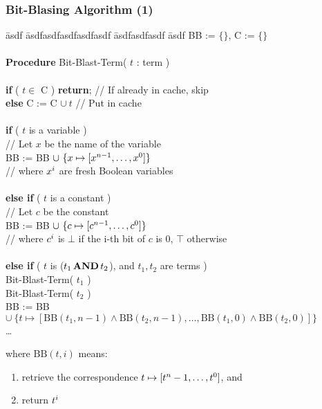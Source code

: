 \begin{frame}[fragile]
  \frametitle{Bit-Blasing Algorithm (1)}

  \tiny

  \begin{tabbing}
    \= asdf \= asdfasdfasdfasdfasdf \= asdfasdfasdf \= asdf \kill
    \> BB := $\{ \}$, C := $\{ \}$ \\
    \> \\
    \> {\bf Procedure} Bit-Blast-Term( $t$ :  term ) \\
    \> \\
    \> {\bf if} ( $t \in $ C ) {\bf return}; \> \> // If already in cache, skip \\
    \> {\bf else} C := C $\cup\ t$     \> \> // Put in cache \\
    \> \\ \pause
    \> {\bf if} ( $t$ is a  variable ) \\
    \> \> // Let $x$ be the name of the variable \\
    \> \> BB := BB $\cup\ \{ x \mapsto [x^{n-1}, \ldots, x^0] \}$ \\
    \> \> // where $x^i$ are fresh Boolean variables \\
    \> \\ \pause
    \> {\bf else if} ( $t$ is a  constant ) \\
    \> \> // Let $c$ be the constant \\
    \> \> BB := BB $\cup\ \{ c \mapsto [c^{n-1}, \ldots, c^0] \} $ \\
    \> \> // where $c^i$ is $\bot$ if the i-th bit of $c$ is $0$, $\top$ otherwise \\
    \> \\ \pause
    \> {\bf else if} ( $t$ is ($t_1 \,{\bf AND}\, t_2$), and $t_1, t_2$ are  terms ) \\
    \> \> Bit-Blast-Term( $t_1$ ) \\
    \> \> Bit-Blast-Term( $t_2$ ) \\
    \> \> BB := BB $\cup\ \{ t \mapsto [\mbox{BB}(t_1, n-1) \wedge \mbox{BB}(t_2, n-1), \ldots, \mbox{BB}(t_1, 0) \wedge \mbox{BB}(t_2, 0)] \} $ \\
    \ldots
  \end{tabbing}

  where $\mbox{BB}(t, i)$ means: 
  \begin{enumerate}
    \item retrieve the correspondence $t \mapsto [t^n-1, \ldots, t^0]$, and
    \item return $t^i$ 
  \end{enumerate}

\end{frame}

